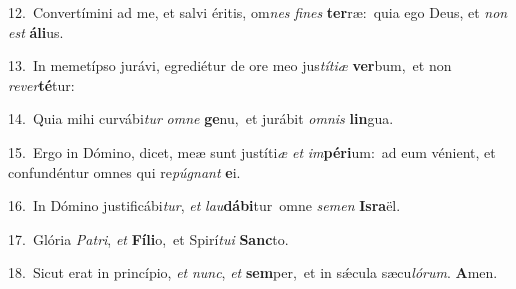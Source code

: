 {\numbfont\textcolor{\numbcolor}{12.}}~Convertímini ad me, et salvi éritis, om\textit{nes} \textit{fi}\-\textit{nes} \textbf{ter}\-ræ:~\star quia ego Deus, et \textit{non} \textit{est} \textbf{á}\-\textbf{li}us.\par
{\numbfont\textcolor{\numbcolor}{13.}}~In memetípso jurávi, egrediétur de ore meo jus\-\textit{tí}\-\textit{ti}\textit{æ} \textbf{ver}\-bum,~\star et non \textit{re}\-\textit{ver}\textbf{té}tur:\par
{\numbfont\textcolor{\numbcolor}{14.}}~Quia mihi curvábi\textit{tur} \textit{om}\-\textit{ne} \textbf{ge}\-nu,~\star et jurábit \textit{om}\-\textit{nis} \textbf{lin}\-gua.\par
{\numbfont\textcolor{\numbcolor}{15.}}~Ergo in Dómino, dicet, meæ sunt justíti\textit{æ} \textit{et} \textit{im}\-\textbf{pé}\textbf{ri}um:~\star ad eum vénient, et confundéntur omnes qui re\-\textit{pú}\-\textit{gnant} \textbf{e}\-i.\par
{\numbfont\textcolor{\numbcolor}{16.}}~In Dómino justificábi\-\textit{tur}\-, \textit{et} \textit{lau}\-\textbf{dá}\textbf{bi}tur~\star omne \textit{se}\-\textit{men} \textbf{Is}\-\textbf{ra}ël.\par
{\numbfont\textcolor{\numbcolor}{17.}}~Glória \textit{Pa}\-\textit{tri}, \textit{et} \textbf{Fí}\-\textbf{li}o,~\star et Spirí\-\textit{tu}\-\textit{i} \textbf{Sanc}\-to.\par
{\numbfont\textcolor{\numbcolor}{18.}}~Sicut erat in princípio, \textit{et} \textit{nunc}\-, \textit{et} \textbf{sem}\-per,~\star et in sǽcula sæcu\-\textit{ló}\-\textit{rum}. \textbf{A}\-men.\par
